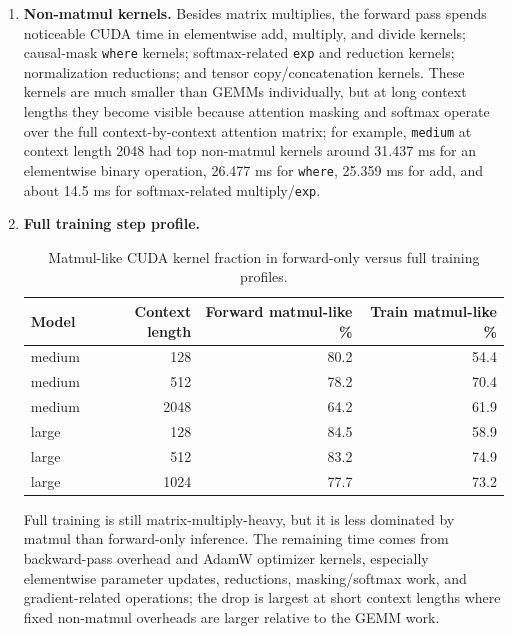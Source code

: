 \documentclass[11pt]{article}
\begin{document}
\begin{enumerate}
  \item \textbf{Non-matmul kernels.}
  Besides matrix multiplies, the forward pass spends noticeable CUDA time in elementwise add, multiply, and divide kernels; causal-mask \texttt{where} kernels; softmax-related \texttt{exp} and reduction kernels; normalization reductions; and tensor copy/concatenation kernels. These kernels are much smaller than GEMMs individually, but at long context lengths they become visible because attention masking and softmax operate over the full context-by-context attention matrix; for example, \texttt{medium} at context length 2048 had top non-matmul kernels around 31.437 ms for an elementwise binary operation, 26.477 ms for \texttt{where}, 25.359 ms for add, and about 14.5 ms for softmax-related multiply/\texttt{exp}.

  \item \textbf{Full training step profile.}
  \begin{table}[H]
    \centering
    \caption{Matmul-like CUDA kernel fraction in forward-only versus full training profiles.}
    \begin{tabular}{lrrr}
      \toprule
      Model & Context length & Forward matmul-like \% & Train matmul-like \% \\
      \midrule
      medium & 128 & 80.2 & 54.4 \\
      medium & 512 & 78.2 & 70.4 \\
      medium & 2048 & 64.2 & 61.9 \\
      large & 128 & 84.5 & 58.9 \\
      large & 512 & 83.2 & 74.9 \\
      large & 1024 & 77.7 & 73.2 \\
      \bottomrule
    \end{tabular}
  \end{table}
  Full training is still matrix-multiply-heavy, but it is less dominated by matmul than forward-only inference. The remaining time comes from backward-pass overhead and AdamW optimizer kernels, especially elementwise parameter updates, reductions, masking/softmax work, and gradient-related operations; the drop is largest at short context lengths where fixed non-matmul overheads are larger relative to the GEMM work.


\end{enumerate}
\end{document}
